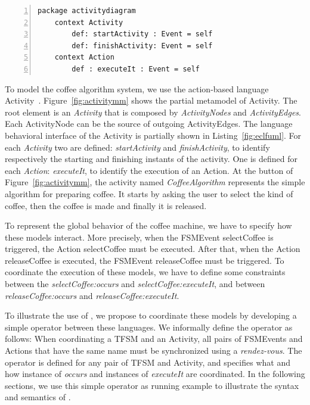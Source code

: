 	\begin{lstlisting}[language=ecl,
	caption={Partial \ecl specification of Activity Diagram},
	label={fig:eclfuml}, 
	basicstyle=\scriptsize\ttfamily, backgroundcolor=\color{LGrey}, numbers=left, xleftmargin=3pt, belowskip=-0.4em]
	package activitydiagram
	context Activity
		def: startActivity : Event = self
		def: finishActivity: Event = self
	context Action
		def : executeIt : Event = self
	\end{lstlisting}
To model the coffee algorithm system, we use the action-based language Activity~\cite{ttc15bib}. Figure~\ref{fig:activitymm} shows the partial metamodel of Activity. The root element is an \emph{Activity} that is composed by \emph{ActivityNodes} and \emph{ActivityEdges}. Each ActivityNode can be the source of outgoing ActivityEdges. The language behavioral interface of the Activity is partially shown in Listing~\ref{fig:eclfuml}. For each \emph{Activity} two \dse are defined: \emph{startActivity} and \emph{finishActivity}, to identify respectively the starting and finishing instants of the activity. One \dse is defined for each \emph{Action}: \emph{executeIt}, to identify the execution of an Action. At the button of Figure~\ref{fig:activitymm}, the activity named \emph{CoffeeAlgorithm} represents the simple algorithm for preparing coffee. It starts by asking the user to select the kind of coffee, then the coffee is made and finally it is released.   

To represent the global behavior of the coffee machine, we have to specify how these models interact. More precisely, when the FSMEvent selectCoffee is triggered, the Action selectCoffee must be executed. After that, when the Action releaseCoffee is executed, the FSMEvent releaseCoffee must be triggered. To coordinate the execution of these models, we have to define some constraints between the \mse \emph{selectCoffee:occurs} and \emph{selectCoffee:executeIt}, and between \emph{releaseCoffee:occurs} and \emph{releaseCoffee:executeIt}.
	
To illustrate the use of \bcool, we propose to coordinate these models by developing a simple \bcool operator between these languages. We informally define the operator as follows: When coordinating a TFSM and an Activity, all pairs of FSMEvents and Actions that have the same name must be synchronized using a \emph{rendez-vous}. The operator is defined for any pair of TFSM and Activity, and specifies what and how instance of \dse \emph{occurs} and instances of \dse \emph{executeIt} are coordinated. In the following sections, we use this simple operator as running example to illustrate the syntax and semantics of \bcool.  	

